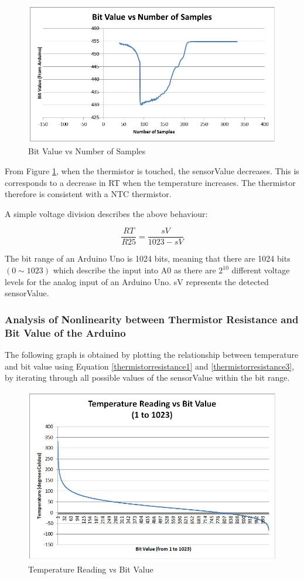 \begin{figure}[H]
	\centering
	\includegraphics[width=0.8\linewidth]{thermistor1.jpg}
	\caption{Bit Value vs Number of Samples}
	\label{bitvaluevssamples}
\end{figure}

From Figure \ref{bitvaluevssamples}, when the thermistor is touched, the sensorValue decreases. This is corresponds to a decrease in RT when the temperature increases. The thermistor therefore is consistent with a NTC thermistor. 

A simple voltage division describes the above behaviour: 

\begin{equation}
	\frac{RT}{R25}=\frac{sV}{1023-sV}
	\label{thermistorresistance3}
\end{equation}

The bit range of an Arduino Uno is 1024 bits, meaning that there are 1024 bits $(0\sim 1023)$ which describe the input into A0 as there are $2^{10}$ different voltage levels for the analog input of an Arduino Uno. sV represents the detected sensorValue. 


\subsubsection{Analysis of Nonlinearity between Thermistor Resistance and Bit Value of the Arduino}

The following graph is obtained by plotting the relationship between temperature and bit value using Equation \ref{thermistorresistance1} and \ref{thermistorresistance3}, by iterating through all possible values of the sensorValue within the bit range.

\begin{figure}[H]
	\centering
	\includegraphics[width=0.8\linewidth]{thermistor2.jpg}
	\caption{Temperature Reading vs Bit Value}
	\label{temperaturevsbitvalue}
\end{figure}

